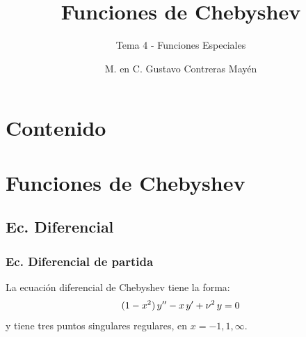 \documentclass[12pt]{beamer}
\date{}
\title{\large{Funciones de Chebyshev}}
\subtitle{Tema 4 - Funciones Especiales}
\author{M. en C. Gustavo Contreras Mayén}
\begin{document}
\maketitle
\fontsize{14}{14}\selectfont
{}

\section*{Contenido}

\section{Funciones de Chebyshev}
\subsection{Ec. Diferencial}

\begin{frame}
\frametitle{Ec. Diferencial de partida}
La ecuación diferencial de Chebyshev tiene la forma:
\pause
\begin{align}
(1 - x^{2}) \, {y}^{\prime \prime} - x \, {y}^{\prime} + \nu^{2} \, y
 = 0
 \label{eq:ecuacion_18_054}
\end{align}
y tiene tres puntos singulares regulares, en $x = -1, 1, \infty$.
\end{frame}
\end{document}
